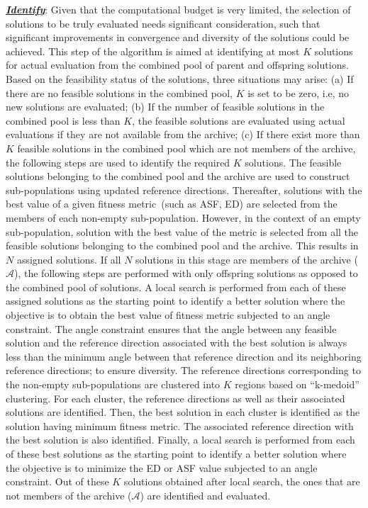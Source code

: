 \documentclass[twocolumn,10pt]{asme2ej}
\begin{document}
\noindent \underline{\it \textbf{Identify}}: Given that the computational budget is very limited, the selection of solutions to be truly evaluated needs significant consideration, such that significant improvements in convergence and diversity of the solutions could be achieved. This step of the algorithm is aimed at identifying at most $K$ solutions for actual evaluation from the combined pool of parent and offspring solutions. Based on the feasibility status of the solutions, three situations may arise: (a) If there are no feasible solutions in the combined pool, $K$ is set to be zero, i.e, no new solutions are evaluated;  (b) If the number of feasible solutions in the combined pool is less than $K$, the feasible solutions are evaluated using actual evaluations if they are not available from the archive; (c) If there exist more than $K$ feasible solutions in the combined pool which are not members of the archive, the following steps are used to identify the required $K$ solutions. The feasible solutions belonging to the combined pool and the archive are used to construct sub-populations using updated reference directions. Thereafter, solutions with the best value of a given fitness metric~(such as ASF, ED) are selected from the members of each non-empty sub-population. However, in the context of an empty sub-population, solution with the best value of the metric is selected from all the feasible solutions belonging to the combined pool and the archive. This results in $N$ assigned solutions. If all $N$ solutions in this stage are members of the archive ($\mathcal{A}$), the following steps are performed with only offspring solutions as opposed to the combined pool of solutions. A local search is performed from each of these assigned solutions as the starting point to identify a better solution where the objective is to obtain the best value of fitness metric subjected to an angle constraint. The angle constraint ensures that the angle between any feasible solution and the reference direction associated with the best solution is always less than the minimum angle between that reference direction and its neighboring reference directions; to ensure diversity. The reference directions corresponding to the non-empty sub-populations are clustered into $K$ regions based on ``k-medoid'' clustering. For each cluster, the reference directions as well as their associated solutions are identified. Then, the best solution in each cluster is identified as the solution having minimum fitness metric. The associated reference direction with the best solution is also identified. Finally, a local search is performed from each of these best solutions as the starting point to identify a better solution where the objective is to minimize the ED or ASF value subjected to an angle constraint. Out of these $K$ solutions obtained after local search, the ones that are not members of the archive ($\mathcal{A}$) are identified and evaluated.    
\end{document}
